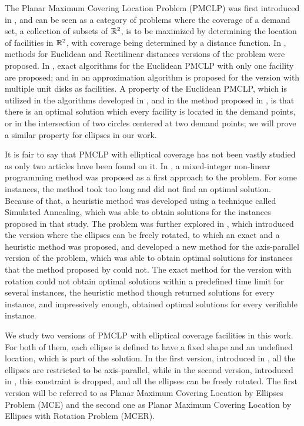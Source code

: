 	
	The Planar Maximum Covering Location Problem (PMCLP) was first introduced in \cite{church:1984}, and can be seen as a category of problems where the coverage of a demand set, a collection of subsets of $\mathbb{R}^2$, is to be maximized by determining the location of facilities in $\mathbb{R}^2$, with coverage being determined by a distance function.
	In \cite{church:1984}, methods for Euclidean and Rectilinear distances versions of the problem were proposed.
	In \cite{drezner, chazelle:1986}, exact algorithms for the Euclidean PMCLP with only one facility are proposed; and in \cite{cabello:2006} an approximation algorithm is proposed for the version with multiple unit disks as facilities.
	A property of the Euclidean PMCLP, which is utilized in the algorithms developed in \cite{drezner, chazelle:1986, cabello:2006}, and in the method proposed in \cite{church:1984}, is that there is an optimal solution which every facility is located in the demand points, or in the intersection of two circles centered at two demand points; we will prove a similar property for ellipses in our work.
	
	It is fair to say that PMCLP with elliptical coverage has not been vastly studied as only two articles have been found on it. In \cite{canbolat}, a mixed-integer non-linear programming method was proposed as a first approach to the problem. For some instances, the method took too long and did not find an optimal solution. Because of that, a heuristic method was developed using a technique called Simulated Annealing, which was able to obtain solutions for the instances proposed in that study.
	The problem was further explored in \cite{andreta}, which introduced the version where the ellipses can be freely rotated, to which an exact and a heuristic method was proposed, and developed a new method for the axis-parallel version of the problem, which was able to obtain optimal solutions for instances that the method proposed by \cite{canbolat} could not.
	The exact method for the version with rotation could not obtain optimal solutions within a predefined time limit for several instances, the heuristic method though returned solutions for every instance, and impressively enough, obtained optimal solutions for every verifiable instance.
	
	We study two versions of PMCLP with elliptical coverage facilities in this work. For both of them, each ellipse is defined to have a fixed shape and an undefined location, which is part of the solution.
	In the first version, introduced in \cite{canbolat}, all the ellipses are restricted to be axis-parallel, while in the second version, introduced in \cite{andreta}, this constraint is dropped, and all the ellipses can be freely rotated.
	The first version will be referred to as Planar Maximum Covering Location by Ellipses Problem (MCE) and the second one as  Planar Maximum Covering Location by Ellipses with Rotation Problem (MCER).
	
